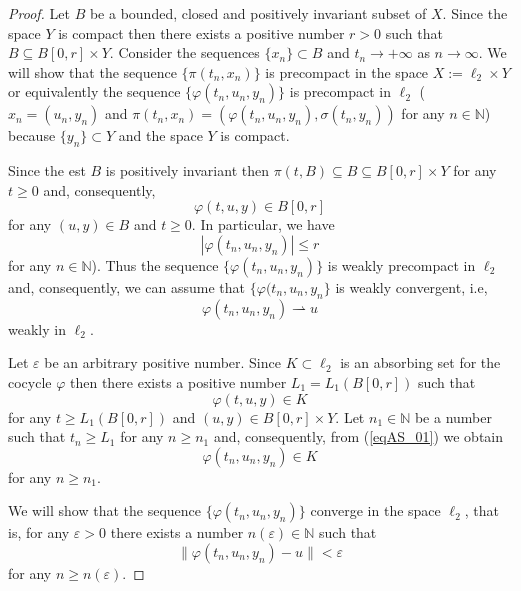 \documentclass{amsart}%
\begin{document}
\begin{proof} Let $B$ be a bounded, closed and positively invariant
subset of $X$. Since the space $Y$ is compact then there exists a
positive number $r>0$ such that $B\subseteq B[0,r]\times Y$.
Consider the sequences $\{x_n\}\subset B$ and $t_n\to +\infty$ as
$n\to \infty$. We will show that the sequence $\{\pi(t_n,x_n)\}$
is precompact in the space $X:=\ell_{2}\times Y$ or equivalently
the sequence $\{\varphi(t_n,u_n,y_n)\}$ is precompact in
$\ell_{2}$ ($x_n=(u_n,y_n)$ and
$\pi(t_n,x_n)=(\varphi(t_n,u_n,y_n),\sigma(t_n,y_n))$ for any
$n\in \mathbb N$) because $\{y_n\}\subset Y$ and the space $Y$ is
compact.

Since the est $B$ is positively invariant then $\pi(t,B)\subseteq
B\subseteq B[0,r]\times Y$ for any $t\ge 0$ and, consequently,
\begin{equation}\label{eqBK1}
\varphi(t,u,y)\in B[0,r] \nonumber
\end{equation}
for any $(u,y)\in B$ and $t\ge 0$. In particular, we have
\begin{equation}\label{BK2}
|\varphi(t_n,u_n,y_n)|\le r \nonumber
\end{equation}
for any $n\in \mathbb N$). Thus the sequence
$\{\varphi(t_n,u_n,y_n)\}$ is weakly precompact in $\ell_{2}$ and,
consequently, we can assume that $\{\varphi(t_n,u_n,y_n\}$ is
weakly convergent, i.e,
\begin{equation}\label{eqWC1}
\varphi(t_n,u_n,y_n)\rightharpoonup u \nonumber
\end{equation}
weakly in $\ell_{2}$.

Let $\varepsilon$ be an arbitrary positive number. Since $K\subset
\ell_{2}$ is an absorbing set for the cocycle $\varphi$ then there
exists a positive number $L_{1}=L_{1}(B[0,r])$ such that
\begin{equation}\label{eqAS_01}
\varphi(t,u,y)\in K
\end{equation}
for any $t\ge L_{1}(B[0,r])$ and $(u,y)\in B[0,r]\times Y$. Let
$n_1\in \mathbb N$ be a number such that $t_n\ge L_{1}$ for any
$n\ge n_1$ and, consequently, from (\ref{eqAS_01}) we obtain
\begin{equation}\label{eqAS_2}
\varphi(t_n,u_n,y_n)\in K
\end{equation}
for any $n\ge n_1$.

We will show that the sequence $\{\varphi(t_n,u_n,y_n)\}$ converge
in the space $\ell_{2}$, that is, for any $\varepsilon >0$ there
exists a number $n(\varepsilon)\in \mathbb N$ such that
\begin{equation}\label{eqAS3}
\|\varphi(t_n,u_n,y_n)-u\|<\varepsilon \nonumber
\end{equation}
for any $n\ge n(\varepsilon)$.


\end{proof}
\end{document}
